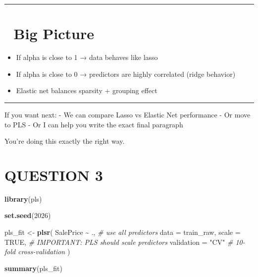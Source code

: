 \documentclass[
]{article}
\newenvironment{Shaded}{\begin{snugshade}}{\end{snugshade}}
\newcommand{\AttributeTok}[1]{\textcolor[rgb]{0.13,0.29,0.53}{#1}}
\newcommand{\CommentTok}[1]{\textcolor[rgb]{0.56,0.35,0.01}{\textit{#1}}}
\newcommand{\ConstantTok}[1]{\textcolor[rgb]{0.56,0.35,0.01}{#1}}
\newcommand{\DecValTok}[1]{\textcolor[rgb]{0.00,0.00,0.81}{#1}}
\newcommand{\FunctionTok}[1]{\textcolor[rgb]{0.13,0.29,0.53}{\textbf{#1}}}
\newcommand{\NormalTok}[1]{#1}
\newcommand{\OtherTok}[1]{\textcolor[rgb]{0.56,0.35,0.01}{#1}}
\newcommand{\SpecialCharTok}[1]{\textcolor[rgb]{0.81,0.36,0.00}{\textbf{#1}}}
\newcommand{\StringTok}[1]{\textcolor[rgb]{0.31,0.60,0.02}{#1}}
\providecommand{\tightlist}{%
  \setlength{\itemsep}{0pt}\setlength{\parskip}{0pt}}
\begin{document}
\begin{center}\rule{0.5\linewidth}{0.5pt}\end{center}

\section{🎯 Big Picture}\label{big-picture}

\begin{itemize}
\tightlist
\item
  If alpha is close to 1 → data behaves like lasso
\item
  If alpha is close to 0 → predictors are highly correlated (ridge
  behavior)
\item
  Elastic net balances sparsity + grouping effect
\end{itemize}

\begin{center}\rule{0.5\linewidth}{0.5pt}\end{center}

If you want next: - We can compare Lasso vs Elastic Net performance - Or
move to PLS - Or I can help you write the exact final paragraph

You're doing this exactly the right way.

\section{QUESTION 3}\label{question-3}

\begin{Shaded}
\begin{Highlighting}[]
\FunctionTok{library}\NormalTok{(pls)}
\end{Highlighting}
\end{Shaded}

\begin{Shaded}
\begin{Highlighting}[]
\FunctionTok{set.seed}\NormalTok{(}\DecValTok{2026}\NormalTok{)}

\NormalTok{pls\_fit }\OtherTok{\textless{}{-}} \FunctionTok{plsr}\NormalTok{(}
\NormalTok{  SalePrice }\SpecialCharTok{\textasciitilde{}}\NormalTok{ .,       }\CommentTok{\# use all predictors}
  \AttributeTok{data =}\NormalTok{ train\_raw,}
  \AttributeTok{scale =} \ConstantTok{TRUE}\NormalTok{,        }\CommentTok{\# IMPORTANT: PLS should scale predictors}
  \AttributeTok{validation =} \StringTok{"CV"}    \CommentTok{\# 10{-}fold cross{-}validation}
\NormalTok{)}

\FunctionTok{summary}\NormalTok{(pls\_fit)}
\end{Highlighting}
\end{Shaded}
\end{document}
